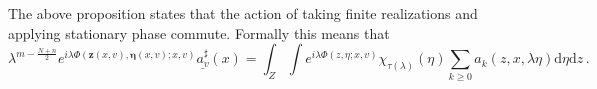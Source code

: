 \documentclass[
	fontsize=11pt, 
	twoside=false, 
	abstract=true, 
	a4paper,
]{scrartcl}
\newcommand{\eps}{\varepsilon}
\newcommand{\RR}{\mathbb{R}}
\newcommand{\CC}{\mathbb{C}}
\newcommand{\dd}{\mathrm{d}}
\newcommand{\del}{\partial}
\newcommand{\td}[1]{\tilde{#1}}
\newcommand{\ud}[1]{\underline{#1}}
\begin{document}
\begin{proposition}
%
\end{proposition}
\begin{remark}
	The above proposition states that the action of taking finite realizations and applying stationary phase commute. Formally this means that
	\[
		\lambda^{m-\frac{N+n}{2}} e^{i\lambda \Phi(\mathbf{z}(x,v), \bm{\eta}(x,v);x,v)}\ud{a_v^\sharp}(x) = \int_Z \int e^{i\lambda\Phi(z,\eta;x,v)}\chi_{\tau(\lambda)}(\eta)\sum_{k\geq 0}a_k(z,x,\lambda\eta)\dd\eta\dd z\,.
	\]

\end{remark}
\end{document}
